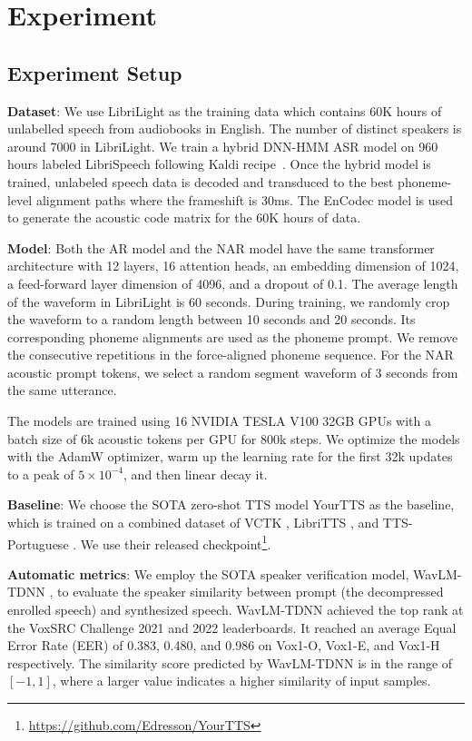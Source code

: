 \documentclass{article}
\theoremstyle{plain}
\theoremstyle{definition}
\theoremstyle{remark}
\begin{document}
\section{Experiment}
\subsection{Experiment Setup}

\textbf{Dataset}: We use LibriLight \citep{kahn2020libri} as the training data which contains 60K hours of unlabelled speech from audiobooks in English. The number of distinct speakers is around 7000 in  LibriLight.  We train a hybrid DNN-HMM ASR model on 960 hours labeled LibriSpeech following Kaldi recipe~\citep{povey2011kaldi}. 
Once the hybrid model is trained, unlabeled speech data is decoded and transduced to the best phoneme-level alignment paths where the frameshift is 30ms. The EnCodec model \citep{defossez2022high} is used to generate the acoustic code matrix for the 60K hours of data. 

\textbf{Model}: Both the AR model and the NAR model have the same transformer architecture with 12 layers, 16 attention heads, an embedding dimension of 1024, a feed-forward layer dimension of 4096, and a dropout of 0.1. The average length of the waveform in LibriLight is 60 seconds. During training, we randomly crop the waveform to a random length between 10 seconds and 20 seconds. Its corresponding phoneme alignments are used as the phoneme prompt. We remove the consecutive repetitions in the force-aligned phoneme sequence. 
For the NAR acoustic prompt tokens, we select a random segment waveform of 3 seconds from the same utterance.

 The models are trained using 16 NVIDIA TESLA V100 32GB GPUs with a batch size of 6k acoustic tokens per GPU for 800k steps. We optimize the models with the AdamW optimizer, warm up the learning rate for the first 32k updates to a peak of $5 \times 10^{-4}$, and then linear decay it. 

 \textbf{Baseline}:  We choose the SOTA zero-shot TTS model YourTTS \citep{casanova2022yourtts} as the baseline, which is trained on a combined dataset of VCTK \citep{veaux2016superseded}, LibriTTS \citep{DBLP:conf/interspeech/ZenDCZWJCW19}, and TTS-Portuguese \citep{DBLP:journals/lre/CasanovaJSOTPA22}. We use their released checkpoint\footnote{\url{https://github.com/Edresson/YourTTS}}. 

 \textbf{Automatic metrics}: We employ the SOTA speaker verification model, WavLM-TDNN \citep{chen2022wavlm}, to evaluate the speaker similarity between prompt (the decompressed enrolled speech) and synthesized speech. WavLM-TDNN achieved the top rank at the VoxSRC Challenge 2021 and 2022 leaderboards. It reached an average Equal Error
Rate (EER) of 0.383, 0.480, and 0.986 on Vox1-O, Vox1-E, and Vox1-H respectively. The similarity score predicted by WavLM-TDNN is in the range of $[-1,1]$, where a larger value indicates a higher similarity of input samples. 
\end{document}

